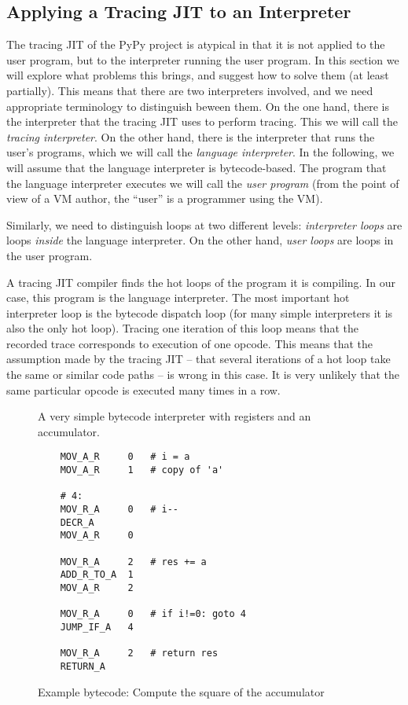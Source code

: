 \documentclass{sig-alternate}
\begin{document}

\subsection{Applying a Tracing JIT to an Interpreter}

The tracing JIT of the PyPy project is atypical in that it is not applied to the
user program, but to the interpreter running the user program. In this section
we will explore what problems this brings, and suggest how to solve them (at least
partially). This means that there are two interpreters involved, and we need appropriate
terminology to distinguish beween them. On the one hand, there is the interpreter that
the tracing JIT uses to perform tracing. This we will call the \emph{tracing
interpreter}. On the other hand, there is the interpreter that runs the
user's programs, which we will call the \emph{language interpreter}. In the
following, we will assume that the language interpreter is bytecode-based. The
program that the language interpreter executes we will call the \emph{user
program} (from the point of view of a VM author, the ``user'' is a programmer
using the VM).

Similarly, we need to distinguish loops at two different levels:
\emph{interpreter loops} are loops \emph{inside} the language interpreter. On
the other hand, \emph{user loops} are loops in the user program.

A tracing JIT compiler finds the hot loops of the program it is compiling. In
our case, this program is the language interpreter. The most important hot interpreter loop
is the bytecode dispatch loop (for many simple
interpreters it is also the only hot loop).  Tracing one iteration of this
loop means that
the recorded trace corresponds to execution of one opcode. This means that the
assumption made by the tracing JIT -- that several iterations of a hot loop
take the same or similar code paths -- is wrong in this case. It is very
unlikely that the same particular opcode is executed many times in a row.
\begin{figure}

\caption{A very simple bytecode interpreter with registers and an accumulator.}
\label{fig:tlr-basic}
\end{figure}
\begin{figure}
{\small
\begin{verbatim}
    MOV_A_R     0   # i = a
    MOV_A_R     1   # copy of 'a'
    
    # 4:
    MOV_R_A     0   # i--
    DECR_A
    MOV_A_R     0    

    MOV_R_A     2   # res += a
    ADD_R_TO_A  1
    MOV_A_R     2
    
    MOV_R_A     0   # if i!=0: goto 4
    JUMP_IF_A   4

    MOV_R_A     2   # return res
    RETURN_A
\end{verbatim}
}
\caption{Example bytecode: Compute the square of the accumulator}
\label{fig:square}
\end{figure}
\end{document}
